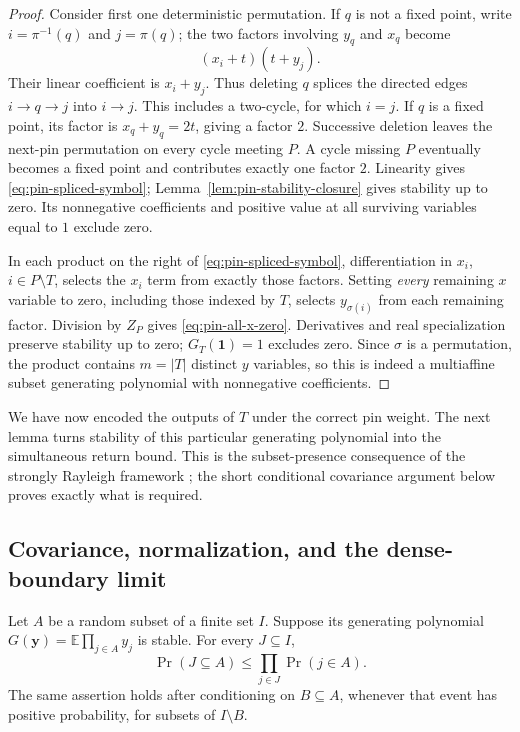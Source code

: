 \begin{proof}
Consider first one deterministic permutation.  If $q$ is not a fixed
point, write $i=\pi^{-1}(q)$ and $j=\pi(q)$; the two factors involving
$y_q$ and $x_q$ become
\[
             (x_i+t)(t+y_j).
\]
Their linear coefficient is $x_i+y_j$.  Thus deleting $q$ splices
the directed edges $i\to q\to j$ into $i\to j$.  This includes a
two-cycle, for which $i=j$.  If $q$ is a fixed point, its factor is
$x_q+y_q=2t$, giving a factor $2$.  Successive deletion leaves the
next-pin permutation on every cycle meeting $P$.  A cycle missing
$P$ eventually becomes a fixed point and contributes exactly one
factor $2$.  Linearity gives \eqref{eq:pin-spliced-symbol};
Lemma~\ref{lem:pin-stability-closure} gives stability up to zero.
Its nonnegative coefficients and positive value at all surviving
variables equal to $1$ exclude zero.

In each product on the right of \eqref{eq:pin-spliced-symbol},
differentiation in $x_i$, $i\in P\setminus T$, selects the $x_i$
term from exactly those factors.  Setting \emph{every} remaining $x$
variable to zero, including those indexed by $T$, selects $y_{\sigma(i)}$
from each remaining factor.  Division by $Z_P$ gives
\eqref{eq:pin-all-x-zero}.  Derivatives and real specialization preserve
stability up to zero; $G_T(\boldsymbol1)=1$ excludes zero.  Since
$\sigma$ is a permutation, the product contains $m=|T|$ distinct
$y$ variables, so this is indeed a multiaffine subset generating
polynomial with nonnegative coefficients.
\end{proof}

We have now encoded the outputs of $T$ under the correct pin weight.
The next lemma turns stability of this particular generating polynomial
into the simultaneous return bound.  This is the subset-presence
consequence of the strongly Rayleigh framework
\cite[Theorem~4.9]{BorceaBrandenLiggett2009}; the short conditional
covariance argument below proves exactly what is required.

\subsection{Covariance, normalization, and the dense-boundary limit}

\begin{lemma}\label{lem:pin-presence}
Let $A$ be a random subset of a finite set $I$.  Suppose its generating
polynomial $G(\boldsymbol y)=\mathbb E\prod_{j\in A}y_j$ is stable.
For every $J\subseteq I$,
\begin{equation}\label{eq:pin-presence-product}
           \Pr(J\subseteq A)\le\prod_{j\in J}\Pr(j\in A).
\end{equation}
The same assertion holds after conditioning on $B\subseteq A$, whenever
that event has positive probability, for subsets of $I\setminus B$.
\end{lemma}

